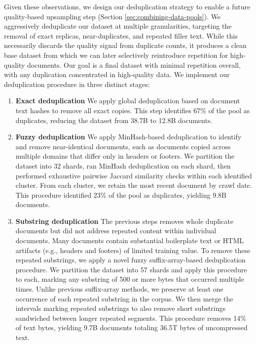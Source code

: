 \documentclass[table]{ai2style/ai2}
\begin{document}
Given these observations, we design our deduplication strategy to enable a future quality-based upsampling step (Section \ref{sec:combining-data-pools}). We aggressively deduplicate our dataset at multiple granularities, targeting the removal of exact replicas, near-duplicates, and repeated filler text. While this necessarily discards the quality signal from duplicate counts, it produces a clean base dataset from which we can later selectively reintroduce repetition for high-quality documents. Our goal is a final dataset with minimal repetition overall, with any duplication concentrated in high-quality data. We implement our deduplication procedure in three distinct stages:

\begin{enumerate}
    \item{{\bf{Exact deduplication}} We apply global deduplication based on document text hashes to remove all exact copies. This step identifies 67\% of the pool as duplicates, reducing the dataset from 38.7B to 12.8B documents.}
    \item{{\bf{Fuzzy deduplication}} We apply MinHash-based deduplication to identify and remove near-identical documents, such as documents copied across multiple domains that differ only in headers or footers. We partition the dataset into 32 shards, ran MinHash deduplication on each shard, then performed exhaustive pairwise Jaccard similarity checks within each identified cluster. From each cluster, we retain the most recent document by crawl date. This procedure identified 23\% of the pool as duplicates, yielding 9.8B documents.}
    \item{{\bf{Substring deduplication}} The previous steps removes whole duplicate documents but did not address repeated content within individual documents. Many documents contain substantial boilerplate text or HTML artifacts (e.g., headers and footers) of limited training value. To remove these repeated substrings, we apply a novel fuzzy suffix-array-based deduplication procedure. We partition the dataset into 57 shards and apply this procedure to each, marking any substring of 500 or more bytes that occurred multiple times. Unlike previous suffix-array methods, we preserve at least one occurrence of each repeated substring in the corpus. We then merge the intervals marking repeated substrings to also remove short substrings sandwiched between longer repeated segments. This procedure removes 14\% of text bytes, yielding 9.7B documents totaling 36.5T bytes of uncompressed text.}
\end{enumerate}
\end{document}
